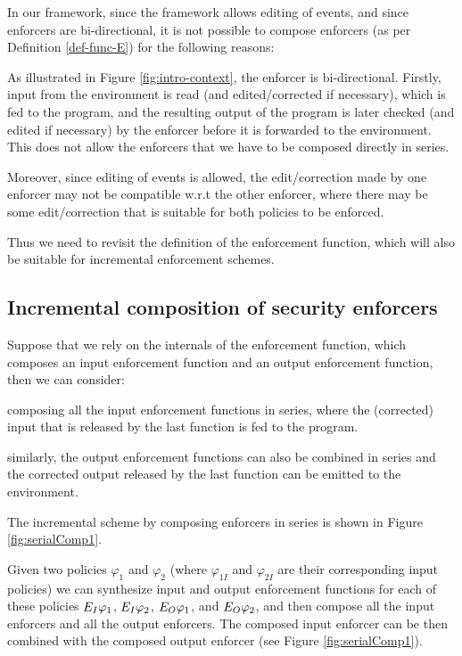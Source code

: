 In our framework, since the framework allows editing of events, and since enforcers are bi-directional, it is not possible to compose enforcers (as per Definition \ref{def-func-E}) for the following reasons: 

\squishlist
\item As illustrated in Figure \ref{fig:intro-context}, the enforcer is bi-directional. Firstly, input from the environment is read (and edited/corrected if necessary), which is fed to the program, and the resulting output of the program is later checked (and edited if necessary) by the enforcer before it is forwarded to the environment. This does not allow the enforcers that we have to be composed directly in series. 
\item Moreover, since editing of events is allowed, the edit/correction made by one enforcer may not be compatible w.r.t the other enforcer, where there may be some edit/correction that is suitable for both policies to be enforced.  
\squishend

Thus we need to revisit the definition of the enforcement function, which will also be suitable for incremental enforcement schemes.
\subsection{Incremental composition of security enforcers} 
\label{sec:serial}
Suppose that we rely on the internals of the enforcement function, which composes an input enforcement function and an output enforcement function, then we can consider:
\squishlist
\item composing all the input enforcement functions in series, where the (corrected) input that is released by the last function is fed to the program.
\item similarly, the output enforcement functions can also be combined in series\blue{,} and the corrected output released by the last function can be emitted to the environment. 
\squishend

The incremental scheme by composing enforcers in series is shown in Figure \ref{fig:serialComp1}.

Given two policies $\varphi_1$ and $\varphi_2$ (where $\varphi_{1I}$ and $\varphi_{2I}$ are their corresponding input policies)\blue{,} we can synthesize input and output enforcement functions for each of these policies $E_{I}{\varphi_1}$,  $E_{I}{\varphi_2}$, $E_{O}{\varphi_1}$, and $E_{O}{\varphi_2}$, 
and then compose all the input enforcers and all the output enforcers. The composed input enforcer can be then combined with the composed output enforcer (see Figure \ref{fig:serialComp1}).

